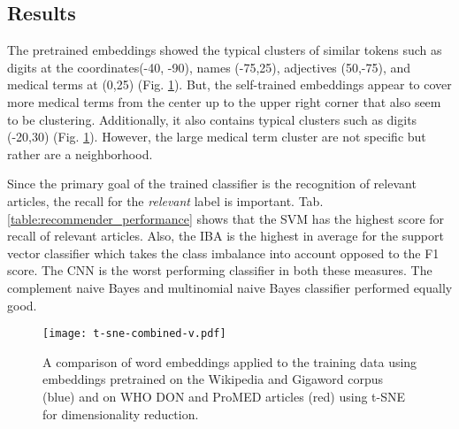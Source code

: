 \subsection{Results}
  The pretrained embeddings showed the typical clusters of similar tokens such as digits at the coordinates(-40, -90), names (-75,25), adjectives (50,-75), and medical terms at (0,25) (Fig. \ref{fig:t-sne}).
  But, the self-trained embeddings appear to cover more medical terms from the center up to the upper right corner that also seem to be clustering.
  Additionally, it also contains typical clusters such as digits (-20,30) (Fig. \ref{fig:t-sne}).
  However, the large medical term cluster are not specific but rather are a neighborhood.

  Since the primary goal of the trained classifier is the recognition of relevant articles, the recall for the \textsl{relevant} label is important.
  Tab. \ref{table:recommender_performance} shows that the SVM has the highest score for recall of relevant articles.
  Also, the IBA is the highest in average for the support vector classifier which takes the class imbalance into account opposed to the F1 score.
  The CNN is the worst performing classifier in both these measures.
  The complement naive Bayes and multinomial naive Bayes classifier performed equally good.

  \begin{figure}
    \centering
    \texttt{[image: t-sne-combined-v.pdf]}
    \caption{A comparison of word embeddings applied to the training data using embeddings pretrained on the Wikipedia and Gigaword corpus (blue) and on WHO DON and ProMED articles (red) using t-SNE for dimensionality reduction.}
  \label{fig:t-sne}
  \end{figure}

